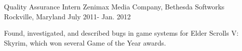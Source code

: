 

\begin{cventries}

  \cventry
    {Quality Assurance Intern} %
    {Zenimax Media Company, Bethesda Softworks} %
    {Rockville, Maryland} %
    {July 2011- Jan. 2012} %
    {
      \begin{cvitems} %
        \item {Found, investigated, and described bugs in game systems for Elder Scrolls V: Skyrim, which won several Game of the Year awards.}
      \end{cvitems}
    }

\end{cventries}
